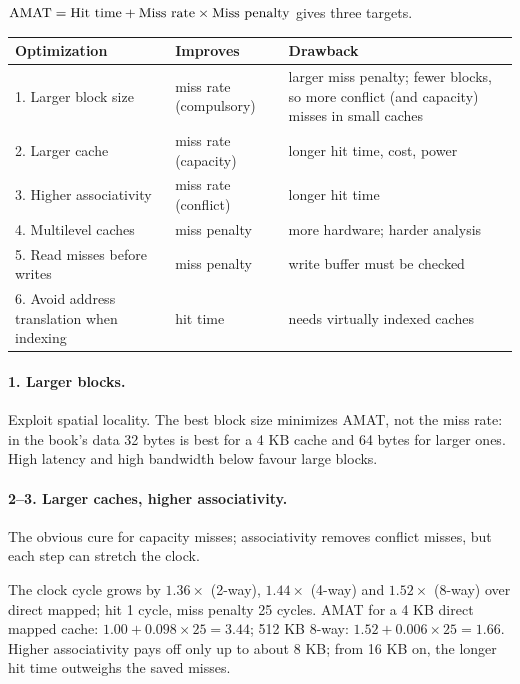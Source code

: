 $\mathrm{AMAT}=\text{Hit time}+\text{Miss rate}\times\text{Miss penalty}$ gives three
targets.
\begin{center}
\small
\begin{tabular}{@{}P{4.3cm}P{3.6cm}P{6cm}@{}}
\toprule
Optimization & Improves & Drawback \\
. Larger block size & miss rate (compulsory) & larger miss penalty; fewer blocks, so more conflict (and capacity) misses in small caches \\
2. Larger cache & miss rate (capacity) & longer hit time, cost, power \\
3. Higher associativity & miss rate (conflict) & longer hit time \\
4. Multilevel caches & miss penalty & more hardware; harder analysis \\
5. Read misses before writes & miss penalty & write buffer must be checked \\
6. Avoid address translation when indexing & hit time & needs virtually indexed caches \\
\bottomrule
\end{tabular}
\end{center}

\paragraph{1. Larger blocks.} Exploit spatial locality. The best block size
minimizes AMAT, not the miss rate: in the book's data 32 bytes is best for a 4 KB
cache and 64 bytes for larger ones. High latency and high bandwidth below favour
large blocks.

\paragraph{2--3. Larger caches, higher associativity.} The obvious cure for capacity
misses; associativity removes conflict misses, but each step can stretch the clock.
\begin{eg}
The clock cycle grows by $1.36\times$ (2-way), $1.44\times$ (4-way) and
$1.52\times$ (8-way) over direct mapped; hit 1 cycle, miss penalty 25 cycles. AMAT for a 4 KB direct
mapped cache: $1.00+0.098\times25=3.44$; 512 KB 8-way: $1.52+0.006\times25=1.66$.
Higher associativity pays off only up to about 8 KB; from 16 KB on, the longer
hit time outweighs the saved misses.
\end{eg}

